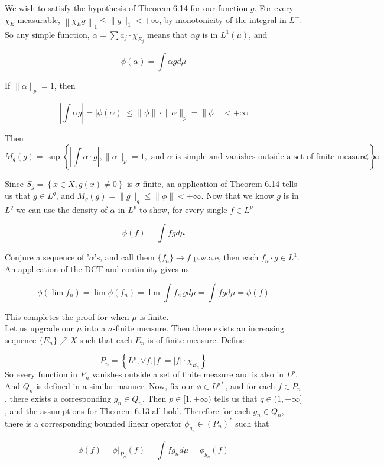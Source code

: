 \documentclass[../main.tex]{subfiles}
\begin{document}
We wish to satisfy the hypothesis of Theorem 6.14 for our function $g$. For every $\chi_E$ measurable, $\left\lVert \chi_E g\right\rVert_1\leq \lVert g\rVert_1<+\infty$, by monotonicity of the integral in $L^+$. So any simple function, $\alpha = \sum a_j\cdot\chi_{E_j}$ means that $\alpha g$ is in $L^1(\mu)$, and

$$
\phi(\alpha) = \int \alpha g d\mu
$$

If $\lVert \alpha \rVert_p = 1$, then 

$$
\left|\int\alpha g\right| = \left|\phi(\alpha)\right| \leq \lVert \phi \rVert\cdot \lVert \alpha\rVert_p  = \lVert \phi \rVert < +\infty
$$

Then 
$$M_q(g) = \sup\left\{\left|\int \alpha\cdot g\right|, \lVert \alpha \rVert_p = 1, \text{ and $\alpha$ is simple and vanishes outside a set of finite measure.}\right\}<\infty$$

Since $S_g = \left\{x\in X, g(x) \neq 0\right\}$ is $\sigma$-finite, an application of Theorem 6.14 tells us that $g\in L^q$, and $M_q(g) = \lVert g \rVert_q\leq \lVert \phi \rVert<+\infty$. Now that we know $g$ is in $L^q$ we can use the density of $\alpha$ in $L^p$ to show, for every single $f\in L^p$

$$
\phi(f) = \int fg d\mu
$$

Conjure a sequence of '$\alpha$'s, and call them $\{f_n\} \to f$ p.w.a.e, then each $f_n\cdot g\in L^1$. An application of the DCT and continuity gives us

$$
\phi(\lim f_n) = \lim\phi(f_n) = \lim \int f_n\,gd\mu = \int fgd\mu=\phi(f)
$$

This completes the proof for when $\mu$ is finite.\\[2ex]

Let us upgrade our $\mu$ into a $\sigma$-finite measure. Then there exists an increasing sequence $\{E_n\}\nearrow X$ such that each $E_n$ is of finite measure. Define 

$$
P_n = \left\{L^p, \forall f, |f| = |f|\cdot\chi_{E_n}\right\}
$$
So every function in $P_n$ vanishes outside a set of finite measure and is also in $L^p$. And $Q_n$ is defined in a similar manner. Now, fix our $\phi\in L^{p*}$, and for each $f\in P_n$, there exists a corresponding $g_n\in Q_n$. Then $p\in[1,+\infty)$ tells us that $q\in ( 1,+\infty]$, and the assumptions for Theorem 6.13 all hold. Therefore for each $g_n\in Q_n$, there is a corresponding  bounded linear operator $\phi_{g_n} \in (P_n)^*$ such that 

$$
\phi(f) = \phi|_{P_n}(f) = \int fg_n d\mu = \phi_{g_n}(f)
$$
\end{document}

